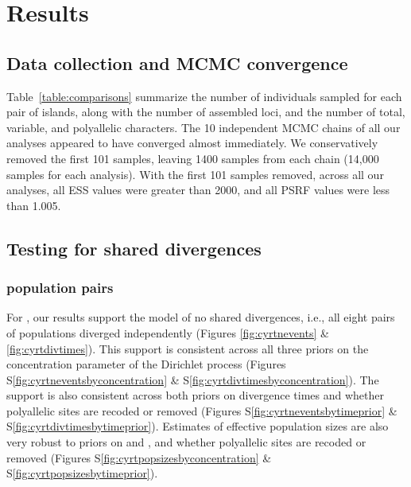 \section{Results}

\subsection{Data collection and MCMC convergence}
Table~\ref{table:comparisons} summarize the number of individuals sampled for
each pair of islands, along with the number of assembled loci, and the number
of total, variable, and polyallelic characters.
The 10 independent MCMC chains of all our \ecoevolity analyses appeared to have
converged almost immediately.
We conservatively removed the first 101 samples, leaving 1400 samples from each
chain (14,000 samples for each analysis).
With the first 101 samples removed, across all our analyses, all ESS values
were greater than 2000, and all PSRF values were less than 1.005.

\subsection{Testing for shared divergences}

\subsubsection{ population pairs}
For , our \ecoevolity results support the model of no shared
divergences, i.e., all eight pairs of populations diverged independently
(Figures \ref{fig:cyrtnevents} \& \ref{fig:cyrtdivtimes}).
This support is consistent across all three priors on the concentration
parameter of the Dirichlet process
(Figures
S\ref{fig:cyrtneventsbyconcentration}
\&
S\ref{fig:cyrtdivtimesbyconcentration}).
The support is also consistent across both priors on divergence times
and whether polyallelic sites are recoded or removed
(Figures
S\ref{fig:cyrtneventsbytimeprior}
\&
S\ref{fig:cyrtdivtimesbytimeprior}).
Estimates of effective population sizes are also very robust to
priors on \concentration and \divtime, and whether polyallelic sites
are recoded or removed
(Figures
S\ref{fig:cyrtpopsizesbyconcentration}
\&
S\ref{fig:cyrtpopsizesbytimeprior}).

